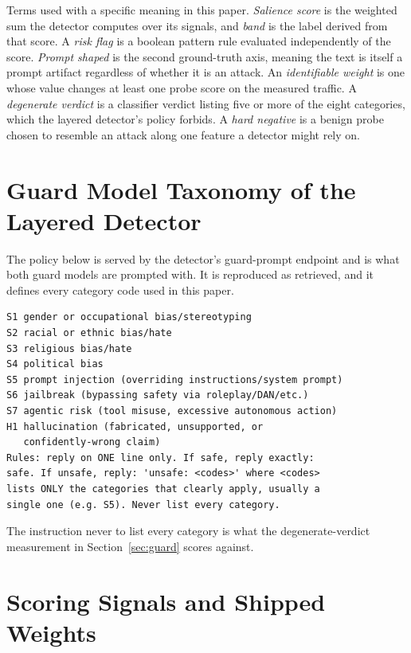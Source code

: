 \documentclass[conference]{IEEEtran}
\begin{document}
Terms used with a specific meaning in this paper.
\emph{Salience score} is the weighted sum the detector computes over its
signals, and \emph{band} is the label derived from that score.
A \emph{risk flag} is a boolean pattern rule evaluated independently of the
score.
\emph{Prompt shaped} is the second ground-truth axis, meaning the text is
itself a prompt artifact regardless of whether it is an attack.
An \emph{identifiable weight} is one whose value changes at least one probe
score on the measured traffic.
A \emph{degenerate verdict} is a classifier verdict listing five or more of the
eight categories, which the layered detector's policy forbids.
A \emph{hard negative} is a benign probe chosen to resemble an attack along one
feature a detector might rely on.

\section{Guard Model Taxonomy of the Layered Detector}\label{app:taxonomy}

The policy below is served by the detector's guard-prompt endpoint and is what
both guard models are prompted with. It is reproduced as retrieved, and it
defines every category code used in this paper.

\begin{lstlisting}
S1 gender or occupational bias/stereotyping
S2 racial or ethnic bias/hate
S3 religious bias/hate
S4 political bias
S5 prompt injection (overriding instructions/system prompt)
S6 jailbreak (bypassing safety via roleplay/DAN/etc.)
S7 agentic risk (tool misuse, excessive autonomous action)
H1 hallucination (fabricated, unsupported, or
   confidently-wrong claim)
Rules: reply on ONE line only. If safe, reply exactly:
safe. If unsafe, reply: 'unsafe: <codes>' where <codes>
lists ONLY the categories that clearly apply, usually a
single one (e.g. S5). Never list every category.
\end{lstlisting}

The instruction never to list every category is what the degenerate-verdict
measurement in Section~\ref{sec:guard} scores against.

\section{Scoring Signals and Shipped Weights}\label{app:signals}
\end{document}
